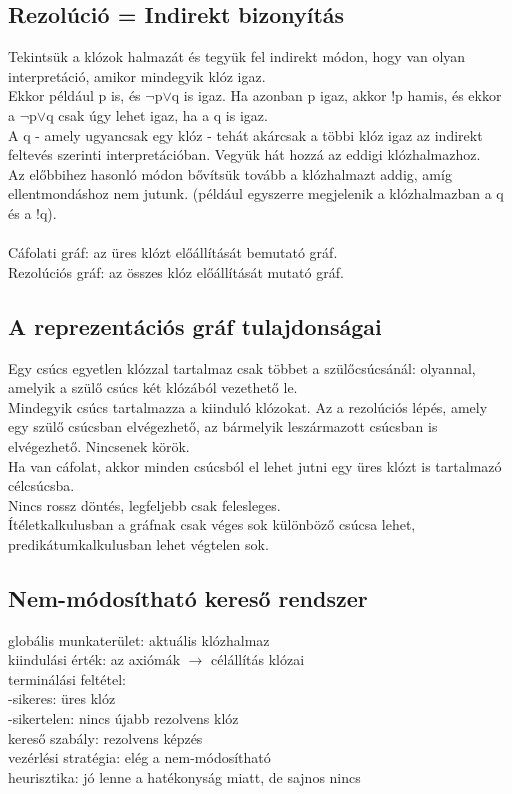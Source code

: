 \documentclass{article}
\begin{document}
	 \subsection{Rezolúció = Indirekt bizonyítás}
	 Tekintsük a klózok halmazát és tegyük fel indirekt módon, hogy van olyan interpretáció, amikor mindegyik klóz igaz.\\
	 Ekkor például p is, és $\neg$p$\vee$q is igaz. Ha azonban p igaz, akkor !p hamis, és ekkor a $\neg$p$\vee$q csak úgy lehet igaz, ha a q is igaz.\\
	 A q - amely ugyancsak egy klóz - tehát akárcsak a többi klóz igaz az indirekt feltevés szerinti interpretációban. Vegyük hát hozzá az eddigi klózhalmazhoz.\\
	 Az előbbihez hasonló módon bővítsük tovább a klózhalmazt addig, amíg ellentmondáshoz nem jutunk. (például egyszerre megjelenik a klózhalmazban a q és a !q).\\ \\
	 Cáfolati gráf: az üres klózt előállítását bemutató gráf.\\
	 Rezolúciós gráf: az összes klóz előállítását mutató gráf.\\
	 
	 \subsection{A reprezentációs gráf tulajdonságai}
	 Egy csúcs egyetlen klózzal tartalmaz csak többet a szülőcsúcsánál: olyannal, amelyik a szülő csúcs két klózából vezethető le.\\
	 Mindegyik csúcs tartalmazza a kiinduló klózokat. Az a rezolúciós lépés, amely egy szülő csúcsban elvégezhető, az bármelyik leszármazott csúcsban is elvégezhető. Nincsenek körök.\\
	 Ha van cáfolat, akkor minden csúcsból el lehet jutni egy üres klózt is tartalmazó célcsúcsba.\\
	 Nincs rossz döntés, legfeljebb csak felesleges.\\
	 Ítéletkalkulusban a gráfnak csak véges sok különböző csúcsa lehet, predikátumkalkulusban lehet végtelen sok.
	 
	 \subsection{Nem-módosítható kereső rendszer}
	 globális munkaterület: aktuális klózhalmaz\\
	 kiindulási érték: az axiómák $\rightarrow$ célállítás klózai\\
	 terminálási feltétel:\\
	 -sikeres: üres klóz\\
	 -sikertelen: nincs újabb rezolvens klóz\\
	 kereső szabály: rezolvens képzés\\
	 vezérlési stratégia: elég a nem-módosítható\\
	 heurisztika: jó lenne a hatékonyság miatt, de sajnos nincs\\
	 
\end{document}
